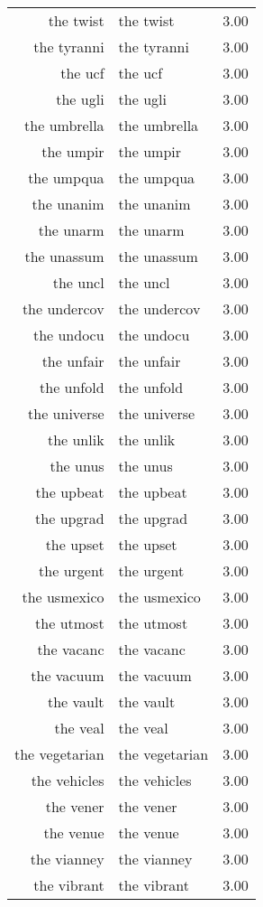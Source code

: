\begin{table}[ht]
\begin{tabular}{rlr}
  the twist & the twist & 3.00 \\ 
  the tyranni & the tyranni & 3.00 \\ 
  the ucf & the ucf & 3.00 \\ 
  the ugli & the ugli & 3.00 \\ 
  the umbrella & the umbrella & 3.00 \\ 
  the umpir & the umpir & 3.00 \\ 
  the umpqua & the umpqua & 3.00 \\ 
  the unanim & the unanim & 3.00 \\ 
  the unarm & the unarm & 3.00 \\ 
  the unassum & the unassum & 3.00 \\ 
  the uncl & the uncl & 3.00 \\ 
  the undercov & the undercov & 3.00 \\ 
  the undocu & the undocu & 3.00 \\ 
  the unfair & the unfair & 3.00 \\ 
  the unfold & the unfold & 3.00 \\ 
  the universe & the universe & 3.00 \\ 
  the unlik & the unlik & 3.00 \\ 
  the unus & the unus & 3.00 \\ 
  the upbeat & the upbeat & 3.00 \\ 
  the upgrad & the upgrad & 3.00 \\ 
  the upset & the upset & 3.00 \\ 
  the urgent & the urgent & 3.00 \\ 
  the usmexico & the usmexico & 3.00 \\ 
  the utmost & the utmost & 3.00 \\ 
  the vacanc & the vacanc & 3.00 \\ 
  the vacuum & the vacuum & 3.00 \\ 
  the vault & the vault & 3.00 \\ 
  the veal & the veal & 3.00 \\ 
  the vegetarian & the vegetarian & 3.00 \\ 
  the vehicles & the vehicles & 3.00 \\ 
  the vener & the vener & 3.00 \\ 
  the venue & the venue & 3.00 \\ 
  the vianney & the vianney & 3.00 \\ 
  the vibrant & the vibrant & 3.00 \\ 

\end{tabular}
\end{table}
